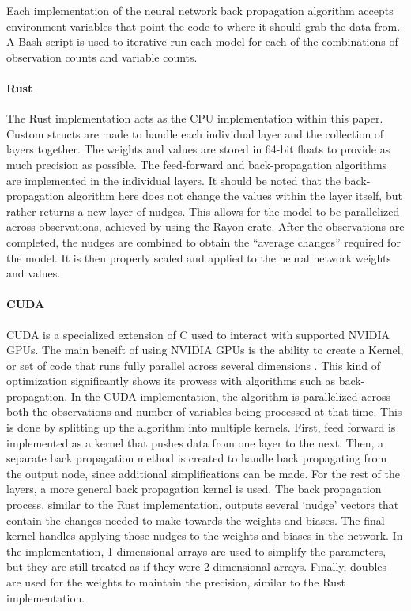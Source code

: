 \documentclass[12pt]{article}
\newcommand{\CC}{C\nolinebreak\hspace{-.05em}\raisebox{.4ex}{\tiny\bf +}\nolinebreak\hspace{-.10em}\raisebox{.4ex}{\tiny\bf + }}
\begin{document}
Each implementation of the neural network back propagation algorithm accepts environment variables that point the code to where it should grab the data from.
A Bash script is used to iterative run each model for each of the combinations of observation counts and variable counts.

\paragraph{Rust}

The Rust \cite{lang_rust} implementation acts as the CPU implementation within this paper.
Custom structs are made to handle each individual layer and the collection of layers together.
The weights and values are stored in 64-bit floats to provide as much precision as possible.
The feed-forward and back-propagation algorithms are implemented in the individual layers.
It should be noted that the back-propagation algorithm here does not change the values within the layer itself, but rather returns a new layer of nudges.
This allows for the model to be parallelized across observations, achieved by using the Rayon \cite{lib_rayon} crate.
After the observations are completed, the nudges are combined to obtain the ``average changes'' required for the model.
It is then properly scaled and applied to the neural network weights and values.


\paragraph{CUDA}

CUDA \cite{lib_cuda} is a specialized extension of \CC \cite{lang_c++} used to interact with supported NVIDIA GPUs.
The main beneift of using NVIDIA GPUs is the ability to create a Kernel, or set of code that runs fully parallel across several dimensions \cite{lib_cuda}.
This kind of optimization significantly shows its prowess with algorithms such as back-propagation.
In the CUDA implementation, the algorithm is parallelized across both the observations and number of variables being processed at that time.
This is done by splitting up the algorithm into multiple kernels.
First, feed forward is implemented as a kernel that pushes data from one layer to the next.
Then, a separate back propagation method is created to handle back propagating from the output node, since additional simplifications can be made.
For the rest of the layers, a more general back propagation kernel is used.
The back propagation process, similar to the Rust implementation, outputs several `nudge' vectors that contain the changes needed to make towards the weights and biases.
The final kernel handles applying those nudges to the weights and biases in the network.
In the implementation, 1-dimensional arrays are used to simplify the parameters, but they are still treated as if they were 2-dimensional arrays.
Finally, doubles are used for the weights to maintain the precision, similar to the Rust implementation.
\end{document}
